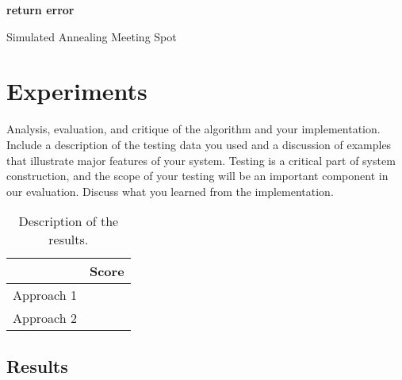 \documentclass[11pt]{article}
\begin{document}
\begin{algorithm}
  \begin{algorithmic}
    \State \textbf{return error}
    \EndIf
      \Else
      \EndIf   
    \EndWhile
    \EndFunction{}
  \end{algorithmic}
  \caption{Simulated Annealing Meeting Spot}
\end{algorithm}



\section{Experiments}
Analysis, evaluation, and critique of the algorithm and your
implementation. Include a description of the testing data you used and
a discussion of examples that illustrate major features of your
system. Testing is a critical part of system construction, and the
scope of your testing will be an important component in our
evaluation. Discuss what you learned from the implementation.

\begin{table}
  \centering
  \begin{tabular}{ll}
    \toprule
    & Score \\
    \midrule
    Approach 1 & \\
    Approach 2 & \\
    \bottomrule
  \end{tabular}
  \caption{Description of the results.}
\end{table}


\subsection{Results}
\end{document}
